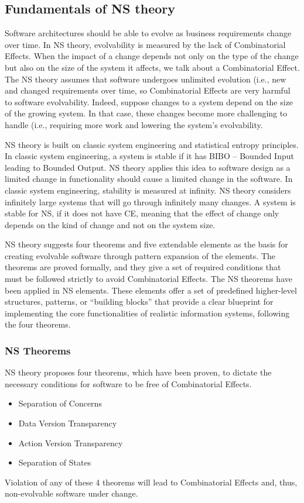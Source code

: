 \subsection{Fundamentals of NS theory}\label{NS Fundamentals} Software architectures
should be able to evolve as business requirements change over time. In NS theory,
evolvability is measured by the lack of Combinatorial Effects. When the impact of a change
depends not only on the type of the change but also on the size of the system it affects,
we talk about a Combinatorial Effect. The NS theory assumes that software undergoes
unlimited evolution (i.e., new and changed requirements over time, so Combinatorial
Effects are very harmful to software evolvability. Indeed, suppose changes to a system
depend on the size of the growing system. In that case, these changes become more
challenging to handle (i.e., requiring more work and lowering the system's evolvability. 

NS theory is built on classic system engineering and statistical entropy principles. In
classic system engineering, a system is stable if it has BIBO – Bounded Input leading to
Bounded Output. NS theory applies this idea to software design as a limited change in
functionality should cause a limited change in the software. In classic system
engineering, stability is measured at infinity. NS theory considers infinitely large
systems that will go through infinitely many changes. A system is stable for NS, if it
does not have CE, meaning that the effect of change only depends on the kind of change and
not on the system size.

NS theory suggests four theorems and five extendable elements as the basis for creating
evolvable software through pattern expansion of the elements. The theorems are proved
formally, and they give a set of required conditions that must be followed strictly to
avoid Combinatorial Effects. The NS theorems have been applied in NS elements. These
elements offer a set of predefined higher-level structures, patterns, or “building blocks”
that provide a clear blueprint for implementing the core functionalities of realistic
information systems, following the four theorems.
%
%
\subsubsection{NS Theorems}\label{NS Theorems}
NS theory proposes four theorems, which have been proven, to dictate the necessary conditions for software to be free of Combinatorial Effects.
\begin{itemize}
    \item Separation of Concerns 
    \item Data Version Transparency
    \item Action Version Transparency 
    \item Separation of States
\end{itemize}
Violation of any of these 4 theorems will lead to Combinatorial Effects and, thus, non-evolvable software under change.
%
%
